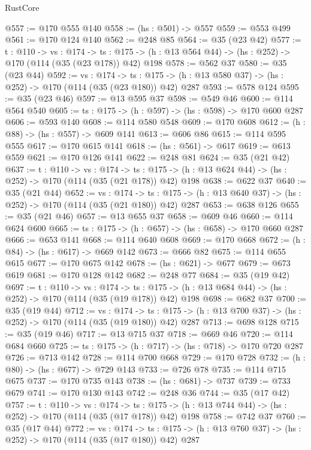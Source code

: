 \begin{lexlean}{RustCore}
\begin{coremodule}
@557 := @170 @555 @140
@558 := (hs : @501) -> @557
@559 := @553 @499
@561 := @170 @124 @140
@562 := @248 @85
@564 := @35 (@23 @42)
@577 := {t : @110} ->
  {vs : @174} ->
  {ts : @175} -> (h : @13 @564 @44) -> (hs : @252) -> @170 (@114 (@35 (@23 @178)) @42) @198
@578 := @562 @37
@580 := @35 (@23 @44)
@592 := {vs : @174} ->
  {ts : @175} -> (h : @13 @580 @37) -> (hs : @252) -> @170 (@114 (@35 (@23 @180)) @42) @287
@593 := @578 @124
@595 := @35 (@23 @46)
@597 := @13 @595 @37
@598 := @549 @46
@600 := @114 @564 @540
@605 := {ts : @175} -> (h : @597) -> (hs : @598) -> @170 @600 @287
@606 := @593 @140
@608 := @114 @580 @548
@609 := @170 @608
@612 := (h : @88) -> (hs : @557) -> @609 @141
@613 := @606 @86
@615 := @114 @595 @555
@617 := @170 @615 @141
@618 := (hs : @561) -> @617
@619 := @613 @559
@621 := @170 @126 @141
@622 := @248 @81
@624 := @35 (@21 @42)
@637 := {t : @110} ->
  {vs : @174} ->
  {ts : @175} -> (h : @13 @624 @44) -> (hs : @252) -> @170 (@114 (@35 (@21 @178)) @42) @198
@638 := @622 @37
@640 := @35 (@21 @44)
@652 := {vs : @174} ->
  {ts : @175} -> (h : @13 @640 @37) -> (hs : @252) -> @170 (@114 (@35 (@21 @180)) @42) @287
@653 := @638 @126
@655 := @35 (@21 @46)
@657 := @13 @655 @37
@658 := @609 @46
@660 := @114 @624 @600
@665 := {ts : @175} -> (h : @657) -> (hs : @658) -> @170 @660 @287
@666 := @653 @141
@668 := @114 @640 @608
@669 := @170 @668
@672 := (h : @84) -> (hs : @617) -> @669 @142
@673 := @666 @82
@675 := @114 @655 @615
@677 := @170 @675 @142
@678 := (hs : @621) -> @677
@679 := @673 @619
@681 := @170 @128 @142
@682 := @248 @77
@684 := @35 (@19 @42)
@697 := {t : @110} ->
  {vs : @174} ->
  {ts : @175} -> (h : @13 @684 @44) -> (hs : @252) -> @170 (@114 (@35 (@19 @178)) @42) @198
@698 := @682 @37
@700 := @35 (@19 @44)
@712 := {vs : @174} ->
  {ts : @175} -> (h : @13 @700 @37) -> (hs : @252) -> @170 (@114 (@35 (@19 @180)) @42) @287
@713 := @698 @128
@715 := @35 (@19 @46)
@717 := @13 @715 @37
@718 := @669 @46
@720 := @114 @684 @660
@725 := {ts : @175} -> (h : @717) -> (hs : @718) -> @170 @720 @287
@726 := @713 @142
@728 := @114 @700 @668
@729 := @170 @728
@732 := (h : @80) -> (hs : @677) -> @729 @143
@733 := @726 @78
@735 := @114 @715 @675
@737 := @170 @735 @143
@738 := (hs : @681) -> @737
@739 := @733 @679
@741 := @170 @130 @143
@742 := @248 @36
@744 := @35 (@17 @42)
@757 := {t : @110} ->
  {vs : @174} ->
  {ts : @175} -> (h : @13 @744 @44) -> (hs : @252) -> @170 (@114 (@35 (@17 @178)) @42) @198
@758 := @742 @37
@760 := @35 (@17 @44)
@772 := {vs : @174} ->
  {ts : @175} -> (h : @13 @760 @37) -> (hs : @252) -> @170 (@114 (@35 (@17 @180)) @42) @287

\end{coremodule}
\end{lexlean}
